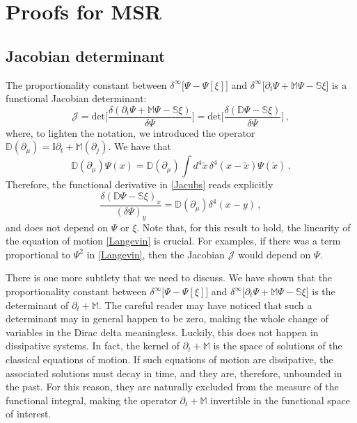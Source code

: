 \documentclass[a4paper, amsfonts, amssymb, amsmath, reprint, showkeys, nofootinbib, twoside,notitlepage,onecolumn]{revtex4-2}
\newcommand{\Da}{{\mathbb{D}}}
\newcommand{\Ma}{{\mathbb{M}}}
\newcommand{\Sa}{{\mathbb{S}}}
\newcommand{\Ia}{{\mathbb{I}}}
\theoremstyle{definition}
\begin{document}
\section{Proofs for MSR}

\subsection{Jacobian determinant}\label{BBB}

The proportionality constant between $\delta^{\infty}\big[\Psi-\Psi[\xi]\big]$ and $\delta^{\infty}\big[\partial_t \Psi {+}\Ma\Psi {-}\Sa\xi\big]$ is a functional Jacobian determinant:
\begin{equation}\label{Jacubs}
    \mathcal{J}= \text{det} \bigg[ \dfrac{\delta (\partial_t \Psi {+}\Ma\Psi {-}\Sa\xi)}{\delta \Psi} \bigg] = \text{det} \bigg[ \dfrac{\delta (\Da \Psi {-}\Sa\xi)}{\delta \Psi} \bigg]  \, ,
\end{equation}
where, to lighten the notation, we introduced the operator $\Da(\partial_\mu)=\Ia \partial_t +\Ma(\partial_j)$. We have that
\begin{equation}
    \Da(\partial_\mu) \Psi(x) = \Da(\partial_\mu) \int d^4 \tilde{x} \, \delta^4(x-\tilde{x}) \Psi(\tilde{x}) \, .
\end{equation}
Therefore, the functional derivative in \eqref{Jacubs} reads explicitly
\begin{equation}
 \dfrac{\delta (\Da \Psi {-}\Sa\xi)_x}{(\delta \Psi)_y} = \Da(\partial_\mu) \delta^4 (x-y) \, , 
\end{equation}
and does not depend on $\Psi$ or $\xi$. Note that, for this result to hold, the linearity of the equation of motion \eqref{Langevin} is crucial. For examples, if there was a term proportional to $\Psi^2$ in \eqref{Langevin}, then the Jacobian $\mathcal{J}$ would depend on $\Psi$.

There is one more subtlety that we need to discuss. We have shown that the proportionality constant between $\delta^{\infty}\big[\Psi-\Psi[\xi]\big]$ and $\delta^{\infty}\big[\partial_t \Psi {+}\Ma\Psi {-}\Sa\xi\big]$ is the determinant of $\partial_t +\Ma$. The careful reader may have noticed that such a determinant may in general happen to be zero, making the whole change of variables in the Dirac delta meaningless. Luckily, this does not happen in dissipative systems. In fact, the kernel of $\partial_t +\Ma$ is the space of solutions of the classical equations of motion. If such equations of motion are dissipative, the associated solutions must decay in time, and they are, therefore, unbounded in the past. For this reason, they are naturally excluded from the measure of the functional integral, making the operator $\partial_t +\Ma$ invertible in the functional space of interest.
\end{document}
